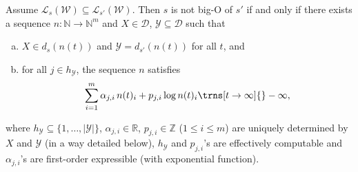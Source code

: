 \documentclass{lmcs}
\theoremstyle{plain}
\theoremstyle{definition}
\theoremstyle{remark}
\newcommand\lng[2]{\mathcal{L}_{#1}(#2)}
\newcommand\dgf{d}
\newcommand\adm{\mathcal{D}}
\newcommand\wa{\mathcal{W}}
\begin{document}
\begin{lem}\label{lem:natlogicalformulationfirst}
Assume  $\lng{s}{\wa}\subseteq \lng{s'}{\wa}$.  Then
$s$ is not big-O of $s'$ if and only if there exists a sequence $n \colon \mathbb{N} \to \mathbb{N}^m$ and $X\in\adm$, $\mathcal{Y}\subseteq\adm$ such that
\begin{enumerate}[(a)]
\item \label{item:condition1} $X\in \dgf_s(n(t))$ and $\mathcal{Y}=\dgf_{s'}(n(t))$ for all $t$, and
\item \label{item:condition2} for all $j \in h_{\mathcal{Y}}$, the sequence $n$ satisfies
\[\sum_{i = 1}^m \alpha_{j,i} \,n(t)_i +  p_{j,i}\log n(t)_i \trns[t\to\infty]{} -\infty,\]
\end{enumerate}
where $h_{\mathcal{Y}} \subseteq \{1,\dots, |\mathcal{Y}|\}$, $\alpha_{j,i}\in \mathbb{R}$, $p_{j,i}\in \mathbb{Z}$ ($1\le i \le m$) are uniquely determined by $X$ and $\mathcal{Y}$ (in a way detailed below),  $h_{\mathcal{Y}}$  and $p_{j,i}$'s are effectively computable and $\alpha_{j,i}$'s are first-order expressible (with exponential function).

\end{lem}
\end{document}
